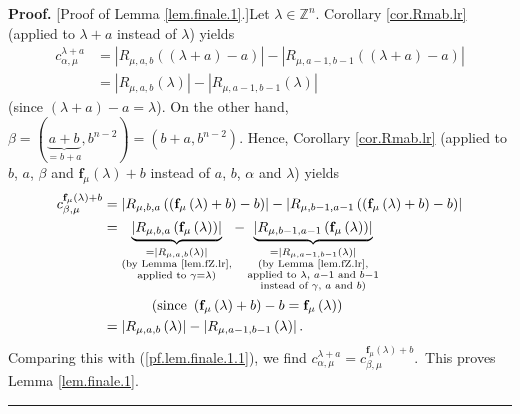 \documentclass[numbers=enddot,12pt,final,onecolumn,notitlepage]{scrartcl}%
\theoremstyle{definition}
\newenvironment{proof}[1][Proof]{\noindent\textbf{#1.} }{\ \rule{0.5em}{0.5em}}
\begin{document}
\begin{proof}
[Proof of Lemma \ref{lem.finale.1}.]Let $\lambda\in\mathbb{Z}^{n}$. Corollary
\ref{cor.Rmab.lr} (applied to $\lambda+a$ instead of $\lambda$) yields%
\begin{align}
c_{\alpha,\mu}^{\lambda+a}  &  =\left\vert R_{\mu,a,b}\left(  \left(
\lambda+a\right)  -a\right)  \right\vert -\left\vert R_{\mu,a-1,b-1}\left(
\left(  \lambda+a\right)  -a\right)  \right\vert \nonumber\\
&  =\left\vert R_{\mu,a,b}\left(  \lambda\right)  \right\vert -\left\vert
R_{\mu,a-1,b-1}\left(  \lambda\right)  \right\vert \label{pf.lem.finale.1.1}%
\end{align}
(since $\left(  \lambda+a\right)  -a=\lambda$). On the other hand,
$\beta=\left(  \underbrace{a+b}_{=b+a},b^{n-2}\right)  =\left(  b+a,b^{n-2}%
\right)  $. Hence, Corollary \ref{cor.Rmab.lr} (applied to $b$, $a$, $\beta$
and $\mathbf{f}_{\mu}\left(  \lambda\right)  +b$ instead of $a$, $b$, $\alpha$
and $\lambda$) yields%
\begin{align*}
c_{\beta,\mu}^{\mathbf{f}_{\mu}\left(  \lambda\right)  +b}  &  =\left\vert
R_{\mu,b,a}\left(  \left(  \mathbf{f}_{\mu}\left(  \lambda\right)  +b\right)
-b\right)  \right\vert -\left\vert R_{\mu,b-1,a-1}\left(  \left(
\mathbf{f}_{\mu}\left(  \lambda\right)  +b\right)  -b\right)  \right\vert \\
&  =\underbrace{\left\vert R_{\mu,b,a}\left(  \mathbf{f}_{\mu}\left(
\lambda\right)  \right)  \right\vert }_{\substack{=\left\vert R_{\mu
,a,b}\left(  \lambda\right)  \right\vert \\\text{(by Lemma \ref{lem.fZ.lr}%
,}\\\text{applied to }\gamma=\lambda\text{)}}}-\underbrace{\left\vert
R_{\mu,b-1,a-1}\left(  \mathbf{f}_{\mu}\left(  \lambda\right)  \right)
\right\vert }_{\substack{=\left\vert R_{\mu,a-1,b-1}\left(  \lambda\right)
\right\vert \\\text{(by Lemma \ref{lem.fZ.lr},}\\\text{applied to }%
\lambda\text{, }a-1\text{ and }b-1\\\text{instead of }\gamma\text{, }a\text{
and }b\text{)}}}\\
&  \ \ \ \ \ \ \ \ \ \ \left(  \text{since }\left(  \mathbf{f}_{\mu}\left(
\lambda\right)  +b\right)  -b=\mathbf{f}_{\mu}\left(  \lambda\right)  \right)
\\
&  =\left\vert R_{\mu,a,b}\left(  \lambda\right)  \right\vert -\left\vert
R_{\mu,a-1,b-1}\left(  \lambda\right)  \right\vert .
\end{align*}
Comparing this with (\ref{pf.lem.finale.1.1}), we find $c_{\alpha,\mu
}^{\lambda+a}=c_{\beta,\mu}^{\mathbf{f}_{\mu}\left(  \lambda\right)  +b}%
$.\ This proves Lemma \ref{lem.finale.1}.
\end{proof}
\end{document}
